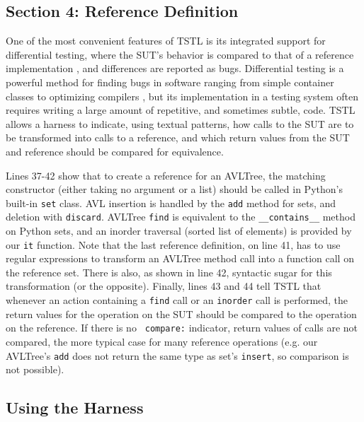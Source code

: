 \documentclass{sig-alternate}
\begin{document}
\subsection{Section 4: Reference Definition}

One of the most convenient features of TSTL is its integrated support
for differential testing, where the SUT's behavior is compared to that
of a reference implementation \cite{Differential,ICSEDiff}, and
differences are reported as bugs.  Differential testing is a powerful
method for finding bugs in software ranging from simple container
classes to optimizing compilers \cite{CSmith}, but its implementation
in a testing system often requires writing a large amount of
repetitive, and sometimes subtle, code.  TSTL allows a harness to
indicate, using textual patterns, how calls to the SUT are to be
transformed into calls to a reference, and which return values from
the SUT and reference should be compared for equivalence.

Lines 37-42 show that to create a reference for an AVLTree, the
matching constructor (either taking no argument or a list) should be
called in Python's built-in {\tt set} class.  AVL insertion is handled
by the {\tt add} method for sets, and deletion with {\tt discard}.
AVLTree {\tt find} is equivalent to the {\tt \_\_contains\_\_} method
on Python sets, and an inorder traversal (sorted list of elements) is
provided by our {\tt it} function.  Note that the last reference
definition, on line 41, has to use regular expressions to transform an
AVLTree method call into a function call on the reference set.  There
is also, as shown in line 42, syntactic sugar for this transformation
(or the opposite). Finally, lines 43 and 44 tell TSTL that whenever an
action containing a {\tt find} call or an {\tt inorder} call is
performed, the return values for the operation on the SUT should be
compared to the operation on the reference.  If there is no {\tt
compare:} indicator, return values of calls are not compared, the more
typical case for many reference operations (e.g. our AVLTree's {\tt add} does not
return the same type as set's {\tt insert}, so comparison is not
possible).

\subsection{Using the Harness}
\end{document}
